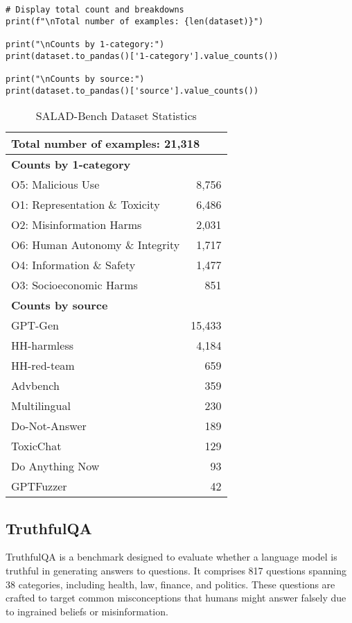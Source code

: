 \begin{verbatim}
# Display total count and breakdowns
print(f"\nTotal number of examples: {len(dataset)}")

print("\nCounts by 1-category:")
print(dataset.to_pandas()['1-category'].value_counts())

print("\nCounts by source:") 
print(dataset.to_pandas()['source'].value_counts())
\end{verbatim}

    
\begin{table*}[h!]
\caption{SALAD-Bench Dataset Statistics}
\begin{tabular}{lr}
\hline
\multicolumn{2}{l}{\textbf{Total number of examples: 21,318}} \\
\hline
\multicolumn{2}{l}{\textbf{Counts by 1-category}} \\
O5: Malicious Use & 8,756 \\
O1: Representation \& Toxicity & 6,486 \\
O2: Misinformation Harms & 2,031 \\
O6: Human Autonomy \& Integrity & 1,717 \\
O4: Information \& Safety & 1,477 \\
O3: Socioeconomic Harms & 851 \\
\hline
\multicolumn{2}{l}{\textbf{Counts by source}} \\
GPT-Gen & 15,433 \\
HH-harmless & 4,184 \\
HH-red-team & 659 \\
Advbench & 359 \\
Multilingual & 230 \\
Do-Not-Answer & 189 \\
ToxicChat & 129 \\
Do Anything Now & 93 \\
GPTFuzzer & 42 \\
\hline
\end{tabular}
\end{table*}

\subsection{TruthfulQA}

TruthfulQA  is a benchmark designed to evaluate whether a language model is truthful in generating answers to questions. It comprises 817 questions spanning 38 categories, including health, law, finance, and politics. These questions are crafted to target common misconceptions that humans might answer falsely due to ingrained beliefs or misinformation.

